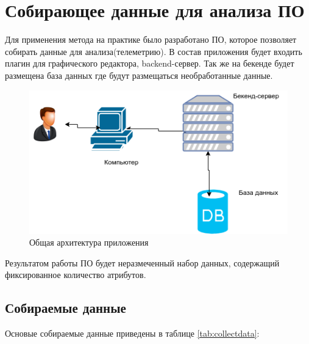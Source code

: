 \section{Собирающее данные для анализа ПО}
Для применения метода на практике было разработано ПО, которое позволяет собирать данные для анализа(телеметрию). В состав приложения будет входить плагин для графического редактора, backend-сервер. Так же на бекенде будет размещена база данных где будут размещаться необработанные данные.
 
\begin{figure}[h]
	\centering
	\includegraphics[width=.5\textwidth]{diagrams/diagram2.png}
	\caption{Общая архитектура приложения}\label{cha:design}
	\label{fig07}
\end{figure}
Результатом работы ПО будет неразмеченный набор данных, содержащий фиксированное количество атрибутов.
\subsection{Собираемые данные}
Основые собираемые данные приведены в таблице \ref{tab:collectdata}:

